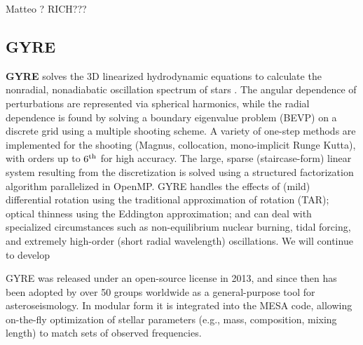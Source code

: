 Matteo ? RICH???     
    
{\color{brown}    
\subsection{GYRE}}
 \textbf{GYRE} solves the 3D linearized hydrodynamic
equations to calculate the nonradial, nonadiabatic oscillation
spectrum of stars \cite{2013MNRAS.435.3406T,Townsend:2017aa}. The angular dependence of perturbations are represented via spherical harmonics, while the radial dependence is found by solving a boundary eigenvalue problem (BEVP) on a discrete grid using a multiple shooting scheme. A variety of one-step methods are implemented for the shooting (Magnus, collocation, mono-implicit Runge Kutta), with orders up to $6^{\rm th}$ for high accuracy. The large, sparse (staircase-form) linear system resulting from the discretization is solved using a structured factorization algorithm parallelized in OpenMP. GYRE handles the effects of (mild) differential rotation using the traditional approximation of rotation (TAR); optical thinness using the Eddington approximation; and can deal with specialized circumstances such as non-equilibrium nuclear burning, tidal forcing, and extremely high-order (short radial wavelength) oscillations. We will continue to develop 

GYRE was released under an open-source license in 2013, and since then has been adopted by over 50 groups worldwide as a general-purpose tool for asteroseismology. In modular form it is integrated into the MESA code, allowing on-the-fly optimization of stellar parameters (e.g., mass, composition, mixing length) to match sets of observed frequencies. 
